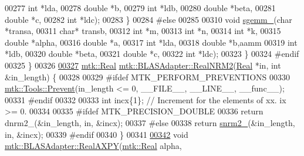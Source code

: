 \begin{DoxyCode}
00277             \textcolor{keywordtype}{int} *lda,
00278             \textcolor{keywordtype}{double} *b,
00279             \textcolor{keywordtype}{int} *ldb,
00280             \textcolor{keywordtype}{double} *beta,
00281             \textcolor{keywordtype}{double} *c,
00282             \textcolor{keywordtype}{int} *ldc);
00283 \}
00284 \textcolor{preprocessor}{#else}
00285 
00310 \textcolor{keywordtype}{void} \hyperlink{namespacemtk_adb7c0560326b8e57f255e58b87ec76b0}{sgemm\_}(\textcolor{keywordtype}{char} *transa,
00311             \textcolor{keywordtype}{char}* transb,
00312             \textcolor{keywordtype}{int} *m,
00313             \textcolor{keywordtype}{int} *n,
00314             \textcolor{keywordtype}{int} *k,
00315             \textcolor{keywordtype}{double} *alpha,
00316             \textcolor{keywordtype}{double} *a,
00317             \textcolor{keywordtype}{int} *lda,
00318             \textcolor{keywordtype}{double} *b,aamm
00319             \textcolor{keywordtype}{int} *ldb,
00320             \textcolor{keywordtype}{double} *beta,
00321             \textcolor{keywordtype}{double} *c,
00322             \textcolor{keywordtype}{int} *ldc);
00323 \}
00324 \textcolor{preprocessor}{#endif}
00325 \}
00326 
\hypertarget{mtk__blas__adapter_8cc_source_l00327}{}\hyperlink{classmtk_1_1BLASAdapter_ab92440888b730863244c5d9479c11aca}{00327} \hyperlink{group__c01-roots_gac080bbbf5cbb5502c9f00405f894857d}{mtk::Real} \hyperlink{classmtk_1_1BLASAdapter_ab92440888b730863244c5d9479c11aca}{mtk::BLASAdapter::RealNRM2}(\hyperlink{group__c01-roots_gac080bbbf5cbb5502c9f00405f894857d}{Real} *in, \textcolor{keywordtype}{int} &in\_length) \{
00328 
00329 \textcolor{preprocessor}{  #ifdef MTK\_PERFORM\_PREVENTIONS}
00330   \hyperlink{classmtk_1_1Tools_a332324c6f25e66be9dff48c5987a3b9f}{mtk::Tools::Prevent}(in\_length <= 0, \_\_FILE\_\_, \_\_LINE\_\_, \_\_func\_\_);
00331 \textcolor{preprocessor}{  #endif}
00332 
00333   \textcolor{keywordtype}{int} incx\{1\};  \textcolor{comment}{// Increment for the elements of xx. ix >= 0.}
00334 
00335 \textcolor{preprocessor}{  #ifdef MTK\_PRECISION\_DOUBLE}
00336   \textcolor{keywordflow}{return} dnrm2\_(&in\_length, in, &incx);
00337 \textcolor{preprocessor}{  #else}
00338   \textcolor{keywordflow}{return} \hyperlink{namespacemtk_a508e99fcb14d526bc43aa0a80aa4b658}{snrm2\_}(&in\_length, in, &incx);
00339 \textcolor{preprocessor}{  #endif}
00340 \}
00341 
\hypertarget{mtk__blas__adapter_8cc_source_l00342}{}\hyperlink{classmtk_1_1BLASAdapter_a081cd092ae65e730f44eae8643edd539}{00342} \textcolor{keywordtype}{void} \hyperlink{classmtk_1_1BLASAdapter_a081cd092ae65e730f44eae8643edd539}{mtk::BLASAdapter::RealAXPY}(\hyperlink{group__c01-roots_gac080bbbf5cbb5502c9f00405f894857d}{mtk::Real} alpha,

\end{DoxyCode}
